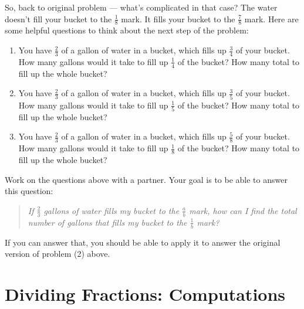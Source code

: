 So, back to original problem --- what's complicated in that case?  The water doesn't fill your bucket to the $\frac 1 8$ mark.  It fills your bucket to  the $\frac 7 8$ mark.
Here are some helpful questions to think about the next step of the problem:
\begin{enumerate}[(2a')]

\item
You have $\frac 2 3$ of a gallon of water in a bucket, which fills up $\frac 3 4$ of your bucket.  How many gallons  would it take to fill up $\frac 1 4$ of the bucket?  How many total to fill up the whole bucket?\\


\item
You have $\frac 2 3$ of a gallon of water in a bucket, which fills up $\frac 3 5$ of your bucket.  How many gallons  would it take to fill up $\frac 1 5$ of the bucket?  How many total to fill up the whole bucket?\\

\item
 You have $\frac 2 3$ of a gallon of water in a bucket, which fills up $\frac 5 8 $ of your bucket.  How many gallons  would it take to fill up $\frac 1 8$ of the bucket?  How many total to fill up the whole bucket?\\

\end{enumerate}


\begin{thinkpair*}
Work on the questions above with a partner.  Your goal is to be able to answer this question:

\begin{quotation}
\emph{If  $\frac 2 3$ gallons of water fills my bucket to the $\frac a b$ mark, how can I find the total number of gallons that fills my bucket to the $\frac 1 b$ mark?}
\end{quotation}

If you can answer that, you should be able to apply it to answer the original version of problem (2) above.
\end{thinkpair*}







\section{Dividing Fractions: Computations}

